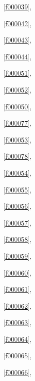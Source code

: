 \noindent\filesourcenumbernameone\ \ref{f000039},\ \pageref{f000039}%

\noindent\filesourcenumbernameone\ \ref{f000042},\ \pageref{f000042}%

\noindent\filesourcenumbernameone\ \ref{f000043},\ \pageref{f000043}%

\noindent\filesourcenumbernameone\ \ref{f000044},\ \pageref{f000044}%

\noindent\filesourcenumbernameone\ \ref{f000051},\ \pageref{f000051}%

\noindent\filesourcenumbernameone\ \ref{f000052},\ \pageref{f000052}%

\noindent\filesourcenumbernameone\ \ref{f000050},\ \pageref{f000050}%

\noindent\filesourcenumbernameone\ \ref{f000077},\ \pageref{f000077}%

\noindent\filesourcenumbernameone\ \ref{f000053},\ \pageref{f000053}%

\noindent\filesourcenumbernameone\ \ref{f000078},\ \pageref{f000078}%

\noindent\filesourcenumbernameone\ \ref{f000054},\ \pageref{f000054}%

\noindent\filesourcenumbernameone\ \ref{f000055},\ \pageref{f000055}%

\noindent\filesourcenumbernameone\ \ref{f000056},\ \pageref{f000056}%

\noindent\filesourcenumbernameone\ \ref{f000057},\ \pageref{f000057}%

\noindent\filesourcenumbernameone\ \ref{f000058},\ \pageref{f000058}%

\noindent\filesourcenumbernameone\ \ref{f000059},\ \pageref{f000059}%

\noindent\filesourcenumbernameone\ \ref{f000060},\ \pageref{f000060}%

\noindent\filesourcenumbernameone\ \ref{f000061},\ \pageref{f000061}%

\noindent\filesourcenumbernameone\ \ref{f000062},\ \pageref{f000062}%

\noindent\filesourcenumbernameone\ \ref{f000063},\ \pageref{f000063}%

\noindent\filesourcenumbernameone\ \ref{f000064},\ \pageref{f000064}%

\noindent\filesourcenumbernameone\ \ref{f000065},\ \pageref{f000065}%

\noindent\filesourcenumbernameone\ \ref{f000066},\ \pageref{f000066}%

